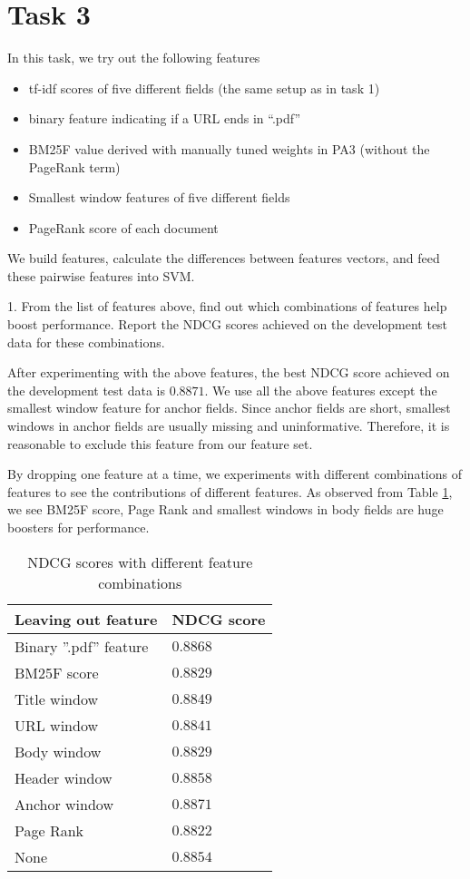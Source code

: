\section{Task 3}
In this task, we try out the following features
\begin{itemize}
  \item[] tf-idf scores of five different fields (the same setup as in task 1)
  \item[] binary feature indicating if a URL ends in ``.pdf''
  \item[] BM25F value derived with manually tuned weights in PA3 (without the PageRank term)
  \item[] Smallest window features of five different fields
  \item[] PageRank score of each document
\end{itemize}
We build features, calculate the differences between features vectors, and feed these pairwise features into SVM.

1. From the list of features above, find out which combinations of features help boost
performance. Report the NDCG scores achieved on the development test data
for these combinations.

After experimenting with the above features, the best NDCG score achieved on the development test data is $0.8871$.
We use all the above features except the smallest window feature for anchor fields.
Since anchor fields are short, smallest windows in anchor fields are usually missing and uninformative.
Therefore, it is reasonable to exclude this feature from our feature set.

By dropping one feature at a time, we experiments with different combinations of features to see the contributions of different features. As observed from Table \ref{tab:perform}, we see BM25F score, Page Rank and smallest windows in body fields are huge boosters for performance.
\begin{table}
\begin{center}
\begin{tabular}{|l|l|}
  \hline
  Leaving out feature & NDCG score \\
  \hline
  Binary ''.pdf'' feature & $0.8868$ \\
  BM25F score & $0.8829$ \\
  Title window & $0.8849$ \\
  URL window & $0.8841$ \\
  Body window & $0.8829$ \\
  Header window & $0.8858$ \\
  Anchor window & $\mathbf{0.8871}$ \\
  Page Rank & $0.8822$ \\
  None & $0.8854$ \\
  \hline
\end{tabular}
\caption{NDCG scores with different feature combinations}\label{tab:perform}
\end{center}
\end{table}



